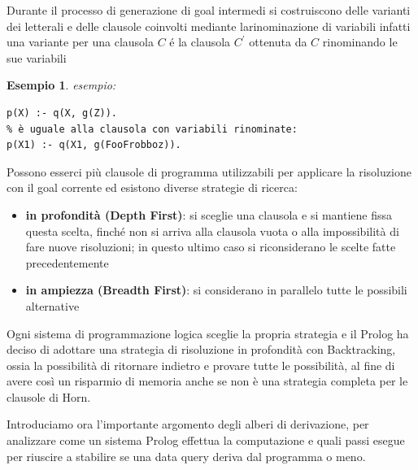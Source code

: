\documentclass[a4paper]{report}
\newtheorem{esempio}{Esempio}
\begin{document}
Durante il processo di generazione di goal intermedi si costruiscono delle varianti dei letterali e delle clausole coinvolti
mediante larinominazione di variabili infatti una variante per una clausola $C$ é la clausola $C^{'}$ ottenuta da $C$ rinominando le sue variabili
\begin{esempio}
esempio:
\begin{verbatim}
p(X) :- q(X, g(Z)).
% è uguale alla clausola con variabili rinominate:
p(X1) :- q(X1, g(FooFrobboz)).
\end{verbatim}
\end{esempio}
Possono esserci più clausole di programma utilizzabili per applicare la risoluzione con il goal corrente ed esistono diverse strategie di ricerca:
\begin{itemize}
\item \textbf{in profondità (Depth First)}: si sceglie una clausola e si mantiene fissa questa scelta, finché non si arriva alla clausola vuota o alla impossibilità di fare nuove risoluzioni; in questo ultimo caso si riconsiderano le scelte fatte precedentemente
\item \textbf{in ampiezza (Breadth First)}: si considerano in parallelo tutte le possibili alternative
\end{itemize}
Ogni sistema di programmazione logica sceglie la propria strategia e il Prolog ha deciso di adottare una strategia di risoluzione
in profondità con Backtracking, ossia la possibilità di ritornare indietro e provare tutte le possibilità, al fine di avere così
un risparmio di memoria anche se non è una strategia completa per le clausole di Horn.

Introduciamo ora l'importante argomento degli alberi di derivazione, per analizzare come un sistema Prolog effettua la computazione
e quali passi esegue per riuscire a stabilire se una data query deriva dal programma o meno.
\end{document}
